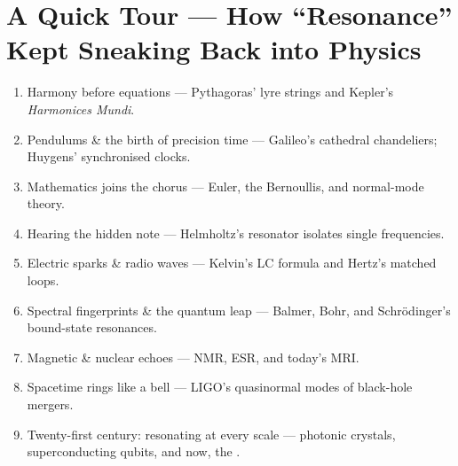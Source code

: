 \section*{A Quick Tour — How “Resonance” Kept Sneaking Back into Physics}
\begin{enumerate}
  \item Harmony before equations — Pythagoras’ lyre strings and Kepler’s \emph{Harmonices Mundi}.
  \item Pendulums \& the birth of precision time — Galileo’s cathedral chandeliers; Huygens’ synchronised clocks.
  \item Mathematics joins the chorus — Euler, the Bernoullis, and normal-mode theory.
  \item Hearing the hidden note — Helmholtz’s resonator isolates single frequencies.
  \item Electric sparks \& radio waves — Kelvin’s LC formula and Hertz’s matched loops.
  \item Spectral fingerprints \& the quantum leap — Balmer, Bohr, and Schrödinger’s bound-state resonances.
  \item Magnetic \& nuclear echoes — NMR, ESR, and today’s MRI.
  \item Spacetime rings like a bell — LIGO’s quasinormal modes of black-hole mergers.
  \item Twenty-first century: resonating at every scale — photonic crystals, superconducting qubits, and now, the  \RCM{}.
\end{enumerate}

\mainmatter
